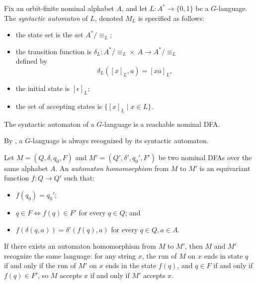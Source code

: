 \documentclass[runningheads]{llncs}
\begin{document}
\begin{definition}
    Fix an orbit-finite nominal alphabet $A$, and let $L : A^* \to \{0,1\}$ be a $G$-language. The \emph{syntactic automaton} of $L$, denoted $M_L$ is specified as follows: 
    \begin{itemize}
        \item the state set is the set $A^* / \equiv_L$;
        \item the transition function is $\delta_L : A^* / \equiv_L \times \ A \to A^* / \equiv_L$\\ defined by 
        \[
            \delta_L([x]_L, a) = [xa]_L,
        \]
        \item the initial state is $[\epsilon]_L$;
        \item the set of accepting states is $\{[x]_L \mid x \in L\}$.
    \end{itemize}
\end{definition}

\begin{lemma}
    The syntactic automaton of a $G$-language is a reachable nominal DFA.
\end{lemma}

By \cite[Lemma 3.7]{bojanczyk-klin-lasota:automata-theory-in-nominal-sets}, a $G$-language is always recognized by its syntactic automaton.

\begin{definition}
    Let $M = (Q, \delta, q_0, F)$ and $M' = (Q', \delta', q_0', F')$ be two nominal DFAs over the same alphabet $A$. 
    An \emph{automaton homomorphism} from $M$ to $M'$ is an equivariant function $f : Q \to Q'$ such that:
    \begin{itemize}
        \item $f(q_0) = q_0'$;
        \item $q \in F \iff f(q) \in F'$ for every $q \in Q$; and 
        \item $f(\delta(q,a)) = \delta'(f(q), a)$ for every $q \in Q, a \in A$.
    \end{itemize}
\end{definition}

If there exists an automaton homomorphism from $M$ to $M'$, then $M$ and $M'$ recognize the same language: for any string $x$, the run of $M$ on $x$ ends in state $q$ if and only if the run of $M'$ on $x$ ends in the state $f(q)$, and $q \in F$ if and only if $f(q) \in F'$, so $M$ accepts $x$ if and only if $M'$ accepts $x$.
\end{document}
